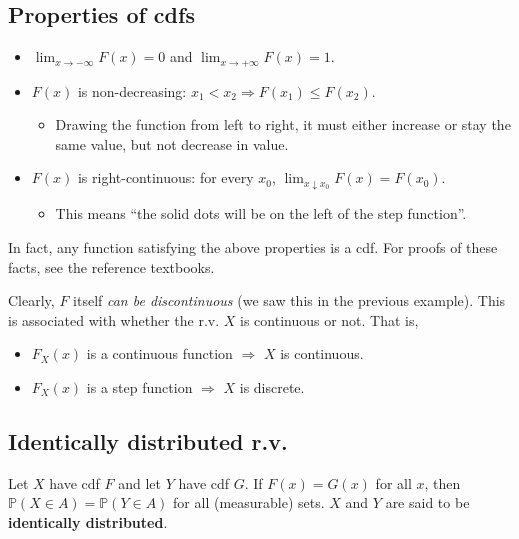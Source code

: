 \documentclass[
]{book}
\providecommand{\tightlist}{%
  \setlength{\itemsep}{0pt}\setlength{\parskip}{0pt}}
\newcommand{\bbP}{\mathbb{P}}
\theoremstyle{definition}
\theoremstyle{definition}
\theoremstyle{definition}
\theoremstyle{definition}
\theoremstyle{remark}
\begin{document}
\hypertarget{properties-of-cdfs}{%
\subsection{Properties of cdfs}\label{properties-of-cdfs}}

\begin{itemize}
\tightlist
\item
  \(\lim_{x\to-\infty} F(x) = 0\) and \(\lim_{x\to+\infty} F(x) = 1\).
\item
  \(F(x)\) is non-decreasing: \(x_1 < x_2 \Rightarrow F(x_1) \leq F(x_2)\).

  \begin{itemize}
  \tightlist
  \item
    Drawing the function from left to right, it must either increase or stay the same value, but not decrease in value.
  \end{itemize}
\item
  \(F(x)\) is right-continuous: for every \(x_0\), \(\lim_{x \downarrow x_0} F(x) = F(x_0)\).

  \begin{itemize}
  \tightlist
  \item
    This means ``the solid dots will be on the left of the step function''.
  \end{itemize}
\end{itemize}

In fact, any function satisfying the above properties is a cdf.
For proofs of these facts, see the reference textbooks.

Clearly, \(F\) itself \emph{can be discontinuous} (we saw this in the previous example).
This is associated with whether the r.v. \(X\) is continuous or not. That is,

\begin{itemize}
\tightlist
\item
  \(F_X(x)\) is a continuous function \(\Rightarrow\) \(X\) is continuous.
\item
  \(F_X(x)\) is a step function \(\Rightarrow\) \(X\) is discrete.
\end{itemize}

\hypertarget{identically-distributed-r.v.}{%
\subsection{Identically distributed r.v.}\label{identically-distributed-r.v.}}

Let \(X\) have cdf \(F\) and let \(Y\) have cdf \(G\).
If \(F(x)=G(x)\) for all \(x\), then \(\bbP(X\in A) = \bbP(Y \in A)\) for all (measurable) sets.
\(X\) and \(Y\) are said to be \textbf{identically distributed}.
\end{document}
